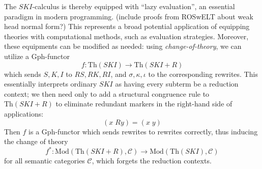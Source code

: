 \documentclass[a4paper,UKenglish]{article}
\theoremstyle{definition}
\newcommand{\Th}{\mathrm{Th}}
\newcommand{\Gph}{\mathrm{Gph}}
\newcommand{\Mod}{\mathrm{Mod}}
\newcommand{\C}{\mathscr{C}}
\begin{document}
The $SKI$-calculus is thereby equipped with ``lazy evaluation'', an essential paradigm in modern programming. (include proofs from ROSwELT about weak head normal form?) This represents a broad potential application of equipping theories with computational methods, such as evaluation strategies. Moreover, these equipments can be modified as needed: using \textit{change-of-theory}, we can utilize a $\Gph$-functor $$f: \Th(SKI) \to \Th(SKI+R)$$ which sends $S,K,I$ to $RS,RK,RI$, and $\sigma, \kappa, \iota$ to the corresponding rewrites. This essentially interprets ordinary $SKI$ as having every subterm be a reduction context; we then need only to add a structural congruence rule to $\Th(SKI+R)$ to eliminate redundant markers in the right-hand side of applications: $$(x\; Ry) = (x\; y)$$ Then $f$ is a $\Gph$-functor which sends rewrites to rewrites correctly, thus inducing the change of theory $$f^*: \Mod(\Th(SKI+R),\C) \to \Mod(\Th(SKI),\C)$$ for all semantic categories $\C$, which forgets the reduction contexts.

\newpage



\end{document}
